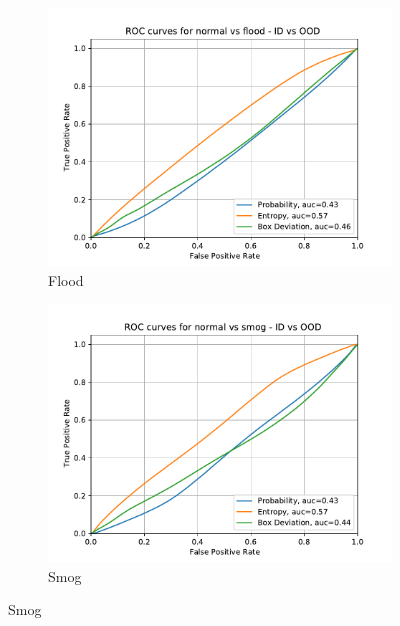     \begin{figure}[H]
    	\centering
    	\begin{subfigure}[t]{0.495\textwidth}
    		\centering
    		\includegraphics[width=\textwidth]{images/weather_roc/normal vs flood_ROC_Score_using_bnn.pdf}
    		\caption{Flood}
    	\end{subfigure}
    	\begin{subfigure}[t]{0.495\textwidth}
    		\centering
    		\includegraphics[width=\textwidth]{images/weather_roc/normal vs smog_ROC_Score_using_bnn.pdf}
    		\caption{Smog}
    	\end{subfigure}
    \end{figure}
